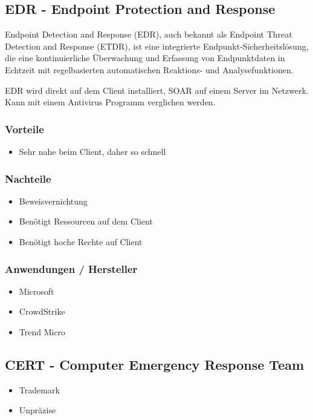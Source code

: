 \subsection{EDR - Endpoint Protection and Response}
Endpoint Detection and Response (EDR), auch bekannt als Endpoint Threat Detection and Response (ETDR), ist eine integrierte Endpunkt-Sicherheitslösung, die eine kontinuierliche Überwachung und Erfassung von Endpunktdaten in Echtzeit mit regelbasierten automatischen Reaktions- und Analysefunktionen.

EDR wird direkt auf dem Client installiert, SOAR auf einem Server im Netzwerk. Kann mit einem Antivirus Programm verglichen werden.

\subsubsection{Vorteile}
\begin{itemize}
    \item Sehr nahe beim Client, daher so schnell
\end{itemize}

\subsubsection{Nachteile}
\begin{itemize}
    \item Beweisvernichtung
    \item Benötigt Ressourcen auf dem Client
    \item Benötigt hoche Rechte auf Client
\end{itemize}

\subsubsection{Anwendungen / Hersteller}
\begin{itemize}
    \item Microsoft
    \item CrowdStrike
    \item Trend Micro
\end{itemize}

\subsection{CERT - Computer Emergency Response Team}
\begin{itemize}
    \item Trademark
    \item Unpräzise
\end{itemize}

